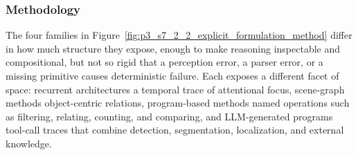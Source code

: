 \subsubsection{Methodology}

The four families in Figure~\ref{fig:p3_s7_2_2_explicit_formulation_method} differ in how much structure they expose, enough to make reasoning inspectable and compositional, but not so rigid that a perception error, a parser error, or a missing primitive causes deterministic failure.
Each exposes a different facet of space: recurrent architectures a temporal trace of attentional focus, scene-graph methods object-centric relations, program-based methods named operations such as filtering, relating, counting, and comparing, and LLM-generated programs tool-call traces that combine detection, segmentation, localization, and external knowledge.


